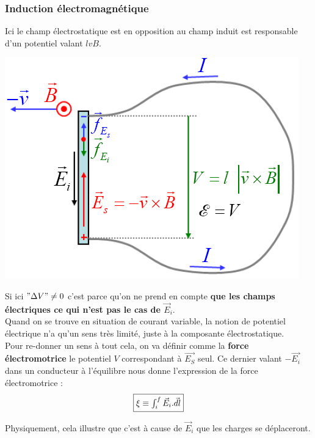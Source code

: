 \documentclass	[11pt, a4paper, openany]{book}
\begin{document}
\subsubsection*{Induction électromagnétique}
Ici le champ électrostatique est en opposition au champ induit est responsable d'un potentiel valant $lvB$. 
\begin{center}
	\includegraphics[scale=0.45]{em/image6.png}\\
\end{center}
Si ici $"\Delta V" \neq 0$ c'est parce qu'on ne prend en compte \textbf{que les champs électriques ce qui n'est pas le cas de $\vec{E}_i$}.\\
Quand on se trouve en situation de courant variable, la notion de potentiel électrique n'a qu'un sens très limité, juste à la composante électrostatique.\\
Pour re-donner un sens à tout cela, on va définir comme la \textbf{force électromotrice} le potentiel $V$ correspondant à $\vec{E_S}$ seul. Ce dernier valant $-\vec{E_i}$ dans un conducteur à l'équilibre nous donne l'expression de la force électromotrice :
\begin{equation}
	\fbox{$ \xi \equiv \int_i^f \vec{E}_i.\vec{dl}$}
\end{equation}

Physiquement, cela illustre que c'est à cause de $\vec{E}_i$ que les charges se déplaceront.
\end{document}
